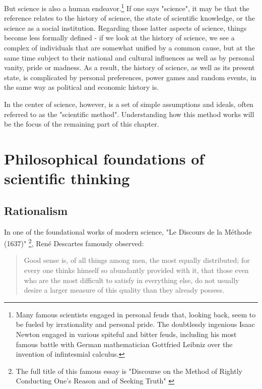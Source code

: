 \documentclass{tufte-book}
\begin{document}
But science is also a human endeavor.\footnote{Many famous scientists engaged in personal feuds that, looking back, seem to be fueled by irrationality and personal pride. The doubtlessly ingenious Isaac Newton engaged in various spiteful and bitter feuds, including his most famous battle with German mathematician Gottfried Leibniz over the invention of infintesmial calculus.} If one says "science", it may be that the reference relates to the history of science, the state of scientific knowledge, or the science as a social institution. Regarding those latter aspects of science, things become less formally defined - if we look at the history of science, we see a complex of individuals that are somewhat unified by a common cause, but at the same time subject to their national and cultural influences as well as by personal vanity, pride or madness. As a result, the history of science, as well as its present state, is complicated by personal preferences, power games and random events, in the same way as political and economic history is.

In the center of science, however, is a set of simple assumptions and ideals, often referred to as the "scientific method". Understanding how this method works will be the focus of the remaining part of this chapter.


\section{Philosophical foundations of scientific thinking}


\subsection{Rationalism}


In one of the foundational works of modern science, "Le Discours de la Méthode (1637)"  \footnote{The full title of this famous essay is "Discourse on the Method of Rightly Conducting One's Reason and of Seeking Truth" \citep{Descartes-DiscourseMethodRightly-1673}}, René Descartes famously observed: 

\begin{quote}
Good sense is, of all things among men, the most equally distributed; for every one thinks himself so abundantly provided with it, that those even who are the most difficult to satisfy in everything else, do not usually desire a larger measure of this quality than they already possess.
\end{quote}
\end{document}
